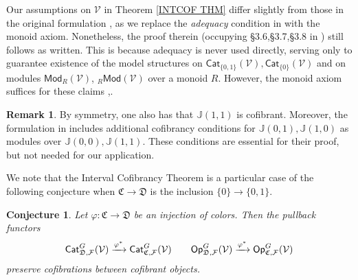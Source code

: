 \documentclass[a4paper,10pt
 ,final
]{article}%
\numberwithin{equation}{section}
\numberwithin{figure}{section}
\newtheorem{conjecture}[equation]{Conjecture}%
\theoremstyle{definition} %
\newtheorem{remark}[equation]{Remark}%
\newcommand{\F}{\ensuremath{\mathcal F}}
\newcommand{\V}{\ensuremath{\mathcal V}}
\newcommand{\1}{\ensuremath{\mathbbm 1}}%
\begin{document}
Our assumptions on $\V$
in Theorem \ref{INTCOF THM} differ slightly
from those in the original formulation \cite[Thm. 1.15]{BM13},
as we replace the \emph{adequacy} condition in
\cite[Def. 1.1]{BM13} with the monoid axiom.
Nonetheless, the proof therein (occupying \S 3.6,\S 3.7,\S 3.8 in \cite{BM13}) still follows as written.
This is because adequacy is never used directly, 
serving only to guarantee existence of the 
model structures 
on $\mathsf{Cat}_{\{0,1\}}(\V),\mathsf{Cat}_{\{0\}}(\V)$
and 
on modules $\mathsf{Mod}_{R}(\V)$, $_R\mathsf{Mod}(\V)$
over a monoid $R$.
However, the monoid axiom suffices for these claims
\cite[Thm. 1.3]{Mur11},\cite[Thm. 4.1]{SS00}.



%



\begin{remark}
By symmetry, one also has that $\mathbb{J}(1,1)$ is cofibrant.
Moreover, the formulation in \cite[Thm. 1.15]{BM13}
includes additional cofibrancy conditions for
$\mathbb{J}(0,1),\mathbb{J}(1,0)$
as modules over $\mathbb{J}(0,0),\mathbb{J}(1,1)$.
These conditions are essential for their proof, 
but not needed for our application.
\end{remark}




We note that the Interval Cofibrancy Theorem is a particular case of the following conjecture when $\mathfrak{C} \to \mathfrak{D}$
is the inclusion $\{0\} \to \{0,1\}$.


\begin{conjecture}\label{CATOP CONJ}
Let $\varphi \colon \mathfrak{C} \to \mathfrak{D}$
be an injection of colors.
Then the pullback functors
\[
	\mathsf{Cat}_{\mathfrak{D},\F}^G(\V)
	\xrightarrow{\varphi^{\**}}
	\mathsf{Cat}_{\mathfrak{C},\F}^G(\V)
\qquad
	\mathsf{Op}_{\mathfrak{D},\F}^G(\V)
	\xrightarrow{\varphi^{\**}}
	\mathsf{Op}_{\mathfrak{C},\F}^G(\V)
\]
preserve cofibrations between cofibrant objects.
\end{conjecture}
\end{document}
